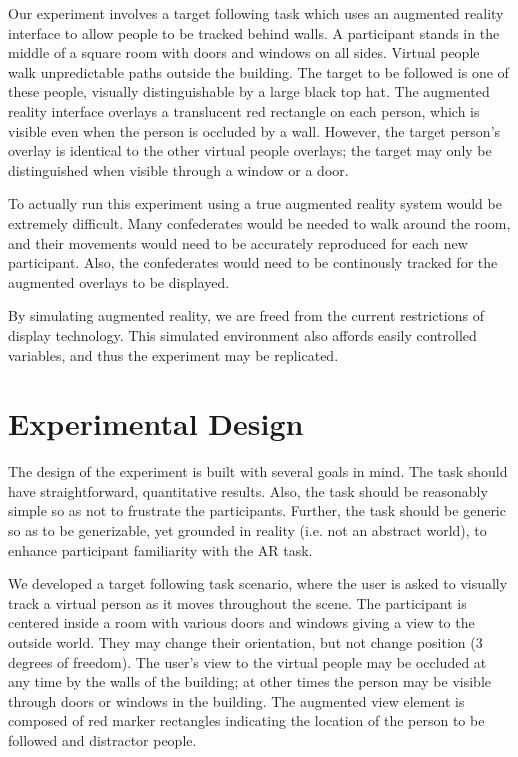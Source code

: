 \documentclass{acmsiggraph}                     %
\begin{document}
Our experiment involves a target following task which uses an augmented reality interface to allow people to be tracked behind walls.  A participant stands in the middle of a square room with doors and windows on all sides.  Virtual people walk unpredictable paths outside the building.  The target to be followed is one of these people, visually distinguishable by a large black top hat.  The augmented reality interface overlays a translucent red rectangle on each person, which is visible even when the person is occluded by a wall.  However, the target person's overlay is identical to the other virtual people overlays; the target may only be distinguished when visible through a window or a door.

To actually run this experiment using a true augmented reality system would be extremely difficult.  Many confederates would be needed to walk around the room, and their movements would need to be accurately reproduced for each new participant.  Also, the confederates would need to be continously tracked for the augmented overlays to be displayed.%

By simulating augmented reality, we are freed from the current restrictions of display technology.  This simulated environment also affords easily controlled variables, and thus the experiment may be replicated.

\section{Experimental Design}

The design of the experiment is built with several goals in mind.  The task should have straightforward, quantitative results.  Also, the task should be reasonably simple so as not to frustrate the participants.  Further, the task should be generic so as to be generizable, yet grounded in reality (i.e. not an abstract world), to enhance participant familiarity with the AR task.

We developed a target following task scenario, where the user is asked to visually track a virtual person as it moves throughout the scene.  The participant is centered inside a room with various doors and windows giving a view to the outside world.  They may change their orientation, but not change position (3 degrees of freedom).  The user's view to the virtual people may be occluded at any time by the walls of the building; at other times the person may be visible through doors or windows in the building.  The augmented view element is composed of red marker rectangles indicating the location of the person to be followed and distractor people.
\end{document}
